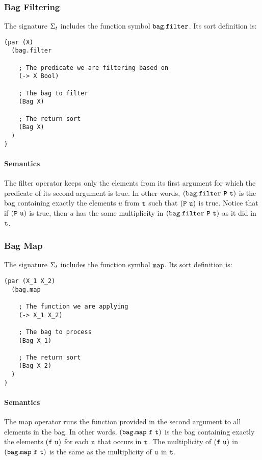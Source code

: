 \documentclass[english,a4paper,10pt]{article}
\begin{document}
\subsubsection{Bag Filtering}
The signature $\Sigma_{t}$ includes 
the function symbol ${\tt bag.filter}$. Its sort definition is:

\begin{verbatim}
(par (X)
  (bag.filter
  
    ; The predicate we are filtering based on
    (-> X Bool)
  
    ; The bag to filter
    (Bag X)
    
    ; The return sort
    (Bag X)
  )
)
\end{verbatim}

\paragraph{Semantics}
The filter operator keeps only the elements
from its first argument
for which the predicate of its second argument is true.
In other words,
${\tt (bag.filter\ P\ t)}$
is the bag containing exactly
the elements $u$ from ${\tt t}$
such that ${\tt (P\ u)}$ is true.
Notice that if ${\tt (P\ u)}$ is true,
then $u$ has the same multiplicity in ${\tt (bag.filter\ P\ t)}$
as it did in ${\tt t}$.

\subsubsection{Bag Map}
The signature $\Sigma_{t}$ includes 
the function symbol ${\tt map}$. Its sort definition is:

\begin{verbatim}
(par (X_1 X_2)
  (bag.map
    
    ; The function we are applying
    (-> X_1 X_2)
  
    ; The bag to process
    (Bag X_1)
    
    ; The return sort
    (Bag X_2)
  )
)
\end{verbatim}

\paragraph{Semantics}
The map operator runs the function provided
in the second argument to all elements in the bag.
In other words,
${\tt (bag.map\ f\ t)}$
is the bag containing exactly
the elements $\syntax{(f\ u)}$
for each ${\tt u}$ that occurs in ${\tt t}$.
The multiplicity of $\syntax{(f\ u)}$
in ${\tt (bag.map\ f\ t)}$
is the same as the multiplicity of ${\tt u}$ in ${\tt t}$.
\end{document}
